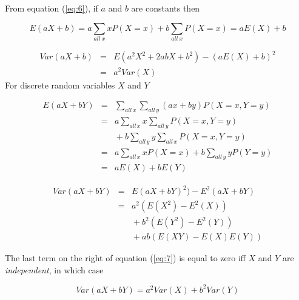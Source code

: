 \documentclass[a5paper]{article}
\begin{document}
From equation (\ref{eq:6}), if $a$ and $b$ are constants then

\begin{equation}
  E(aX + b) = a\sum_{all\ x}xP(X\!=\!x)+ b\sum_{all\ x}P(X\!=\!x)  = aE(X) + b
\end{equation}

\begin{eqnarray}
  Var(aX + b) &=& E(a^2X^2 + 2abX + b^2) - (aE(X) + b)^2 \nonumber\\
  &=& a^2Var(X)
\end{eqnarray}
\noindent For discrete random variables $X$ and $Y$

\begin{eqnarray}
  E(aX + bY) & = & \sum_{all\,x}\sum_{all\,y}(ax + by)P(X\!=\!x,Y\!=\!y)\nonumber\\
  & = & a\sum_{all\,x}x\sum_{all\,y}P(X\!=\!x,Y\!=\!y)\nonumber\\
  & & \mbox{} + b\sum_{all\,y}y\sum_{all\,x} P(X\!=\!x,Y\!=\!y)\nonumber\\
  & = & a\sum_{all\,x}xP(X\!=\!x) + b\sum_{all\,y}yP(Y\!=\!y)\nonumber\\
  & = & aE(X) + bE(Y)
\end{eqnarray}

\begin{eqnarray} \label{eq:7}
  Var(aX + bY) & = & E(aX + bY)^2) - E^2(aX + bY) \nonumber\\
  &=& a^2(E(X^2) - E^2(X)) \nonumber\\
  & & \mbox{} + b^2(E(Y^2) - E^2(Y)) \nonumber\\
  & & \mbox{} + ab(E(XY) - E(X)E(Y))
\end{eqnarray}

\noindent The last term on the right of equation (\ref{eq:7}) is equal to zero
iff $X$ and $Y$ are \textit{independent}, in which case

\begin{equation}
  Var(aX + bY) = a^2Var(X) + b^2Var(Y)
\end{equation}
\end{document}
